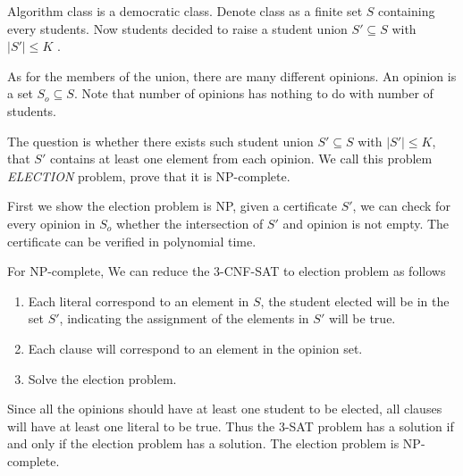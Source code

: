 \begin{exercise}[]{   Algorithm class is a democratic class. Denote class as a finite set $S$ containing every students. Now students decided to raise a student union $S' \subseteq S$ with $|S'|\leq K$ .
	
	As for the members of the union, there are many different opinions. An opinion is a set $S_o\subseteq S$. Note that number of opinions has nothing to do with number of students.
	
	The question is whether there exists such student union $S' \subseteq S$ with $|S'|\leq K$, that $S'$ contains at least one element from each opinion. We call this problem \emph{ELECTION} problem, prove that it is NP-complete.
    }
  \begin{solution} First we show the election problem is NP, given a certificate $S'$, we can check for every opinion in $S_{o}$ whether the intersection of $S'$ and opinion is not empty. The certificate can be verified in polynomial time.
    
    For NP-complete, We can reduce the 3-CNF-SAT to election problem as follows
    \begin{enumerate}
      \item Each literal correspond to an element in $S$, the student elected will be in the set $S'$, indicating the assignment of the elements in $S'$ will be true.
      \item Each clause will correspond to an element in the opinion set.
      \item Solve the election problem.
    \end{enumerate}
    Since all the opinions should have at least one student to be elected, all clauses will have at least one literal to be true. Thus the 3-SAT problem has a solution if and only if the election problem has a solution. The election problem is NP-complete.
  \end{solution}
  \label{ex3}
\end{exercise}



